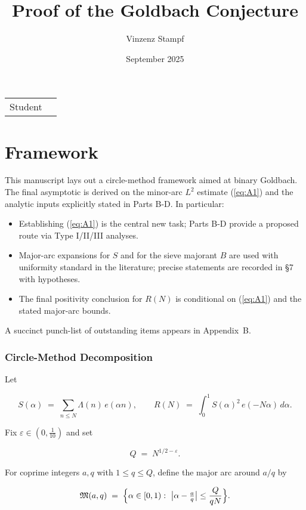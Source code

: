 \documentclass[11pt]{article}
\title{Proof of the Goldbach Conjecture}
\author{Vinzenz Stampf}
\date{September 2025}
\makeatletter
\def\eqref#1{(\ref{#1})}%
\theoremstyle{definition}
\theoremstyle{remark}
\numberwithin{equation}{part}
\providecommand{\theauthor}{\@author}
\makeatother
\begin{document}
\tableofcontents

\maketitle

\noindent\begin{tabular}{@{}ll}
	Student & \theauthor \\
\end{tabular}

\part{Framework}

This manuscript lays out a circle-method framework aimed at binary Goldbach. The final asymptotic is derived on the minor-arc $L^2$ estimate \eqref{eq:A1} and the analytic inputs explicitly stated in Parts B-D. In particular:

\begin{itemize}
	\item Establishing \eqref{eq:A1} is the central new task; Parts B-D provide a proposed route via Type I/II/III analyses.
	\item Major-arc expansions for $S$ and for the sieve majorant $B$ are used with uniformity standard in the literature; precise statements are recorded in §7 with hypotheses.
	\item The final positivity conclusion for $R(N)$ is conditional on \eqref{eq:A1} and the stated major-arc bounds.
\end{itemize}

A succinct punch-list of outstanding items appears in Appendix~B.

\section{Circle-Method Decomposition}

Let

$$
	S(\alpha)\;=\;\sum_{n\le N}\Lambda(n)\,e(\alpha n),\qquad
	R(N)\;=\;\int_{0}^{1} S(\alpha)^2\,e(-N\alpha)\,d\alpha .
$$

Fix $\varepsilon\in (0,\tfrac1{10})$ and set

$$
	Q \;=\; N^{1/2-\varepsilon}.
$$

For coprime integers $a,q$ with $1\le q\le Q$, define the major arc around $a/q$ by

$$
	\mathfrak M(a,q)\;=\;\Bigl\{\alpha\in[0,1):\ \bigl|\alpha-\tfrac{a}{q}\bigr|
	\le \frac{Q}{qN}\Bigr\}.
$$
\end{document}
